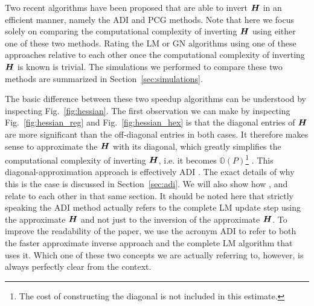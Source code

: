 \documentclass[useAMS,usenatbib]{mn2e}
\newcommand{\bH}{\bmath{H}}
\newcommand{\bmH}{\bmath{\mathcal{H}}}
\begin{document}
Two recent algorithms have been proposed that are able to invert $\bH$ in an efficient manner, namely the ADI \citep{Marthi2014} and PCG \citep{Liu2010} methods. 
Note that here we focus solely on comparing the computational complexity of inverting $\bH$ using either one of these two methods. Rating the LM or GN algorithms
using one of these approaches relative to each other once the computational complexity of inverting $\bH$ is known is trivial. The simulations we performed to compare these two 
methods are summarized in Section~\ref{sec:simulations}.


The basic difference between these two speedup algorithms can be understood by inspecting Fig.~\ref{fig:hessian}. The first observation we can make by inspecting 
Fig.~\ref{fig:hessian_reg} and Fig.~\ref{fig:hessian_hex} is that the diagonal entries of $\bH$ are more significant than the off-diagonal entries in both cases.
It therefore makes sense to approximate the $\bH$ with its diagonal, which greatly simplifies the computational complexity of inverting 
$\bH$, i.e. it becomes $\mathbb{O}(P)$\footnote{The cost of constructing 
the diagonal is not included in this estimate.} \citep{Smirnov2015}. This diagonal-approximation approach is effectively ADI \citep{Marthi2014}. The exact details of why this 
is the case is discussed in Section~\ref{sec:adi}. We will also show how \citet{Marthi2014}, \citet{Smirnov2015} and \citet{Salvini2014} relate to each other in that same section. It should be noted here that strictly speaking the ADI method actually refers to the complete LM update step using the approximate $\bH$ and not just 
to the inversion of the approximate $\bH$. To improve the readability of the paper, we use the acronym ADI to refer to both the faster approximate inverse approach and the complete LM algorithm that uses it.
Which one of these two concepts we are actually referring to, however, is always perfectly clear from the context.
\end{document}
